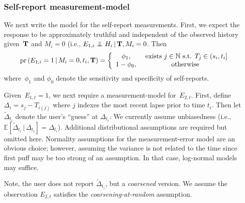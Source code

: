 \documentclass[11pt]{amsart}
\def\pr{\mathop{\text{pr}}\nolimits}
\def\pr{\mathop{\text{pr}}\nolimits}
\def\E{\mathcal{E}}
\def\indep{\mathrel{\rlap{$\perp$}\kern1.6pt\mathord{\perp}}}
\def\E{\mathbb{E}}
\def\given{\, | \,}
\def\Nat{\mathbb{N}}
\def\bfT{{\bf T}}
\begin{document}
\subsubsection{Self-report measurement-model}

We next write the model for the self-report measurements.
First, we expect the response to be approximately truthful and
independent of the observed history given~$\bfT$ and $M_{i} = 0$
(i.e., $E_{1,i} \indep H_{i} \given \bfT, M_{i} = 0$. Then
\[
\pr \left( E_{1,i} = 1 \given M_{i} = 0, t_i, \bfT \right) =  \left \{
  \begin{array}{c c}
    \phi_1, & \text{ exists } j \in \Nat \text{ s.t. } T_j \in (s_i, t_i] \\
    1-\phi_0, & \text{ otherwise } \\
  \end{array}
\right .
\]
where~$\phi_1$ and $\phi_0$ denote the sensitivity and specificity of
self-reports.  %

Given~$E_{1,t} = 1$, we next require a measurement-model
for~$E_{2,t}$.  First, define~$\Delta_{i} = s_j - T_{i(j)}$ where $j$
indexes the most recent lapse prior to time $t_i$.
Then let~$\tilde \Delta_{t_i}$ denote the user's ``guess'' at
$\Delta_{t_i}$.
We currently assume unbiasedness (i.e., $\E [ \tilde \Delta_{t_i}
\given \Delta_{t_i}] = \Delta_{t_i}$). Additional distributional
assumptions are required but omitted here.  Normality assumptions for the
measurement-error model are an obvious choice; however, assuming the
variance is not related to the time since first puff may be too strong
of an assumption.  In that case, log-normal models may suffice.

Note, the user does not report $\tilde \Delta_{t_i}$, but a
\emph{coarsened} version.  We assume the observation $E_{2,t}$
satisfies the \emph{coarsening-at-random} assumption.
\end{document}
